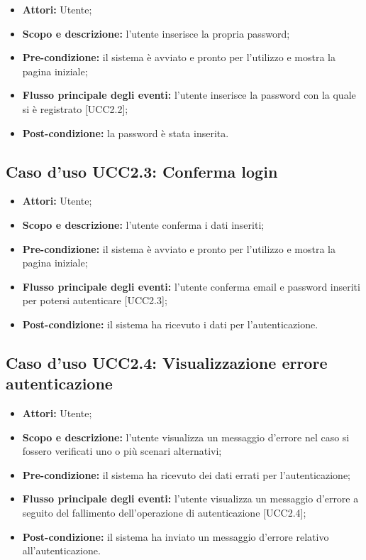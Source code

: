 \begin{itemize}
\item \textbf{Attori:} Utente;
\item \textbf{Scopo e descrizione:} l'utente inserisce la propria password;
\item \textbf{Pre-condizione:} il sistema è avviato e pronto per l'utilizzo e mostra la pagina iniziale;
\item \textbf{Flusso principale degli eventi:} l'utente inserisce la password con la quale si è registrato [UCC2.2];
\item \textbf{Post-condizione:} la password è stata inserita.
\end{itemize}

\subsection{Caso d'uso UCC2.3: Conferma login}

\begin{itemize}
\item \textbf{Attori:} Utente;
\item \textbf{Scopo e descrizione:} l'utente conferma i dati inseriti;
\item \textbf{Pre-condizione:} il sistema è avviato e pronto per l'utilizzo e mostra la pagina iniziale;
\item \textbf{Flusso principale degli eventi:} l'utente conferma email e password inseriti per potersi autenticare [UCC2.3];
\item \textbf{Post-condizione:} il sistema ha ricevuto i dati per l'autenticazione. 
\end{itemize}

\subsection{Caso d'uso UCC2.4: Visualizzazione errore autenticazione}

\begin{itemize}
\item \textbf{Attori:} Utente;
\item \textbf{Scopo e descrizione:} l'utente visualizza un messaggio d'errore nel caso si fossero verificati uno o più scenari alternativi;
\item \textbf{Pre-condizione:} il sistema ha ricevuto dei dati errati per l'autenticazione;
\item \textbf{Flusso principale degli eventi:} l'utente visualizza un messaggio d'errore a seguito del fallimento dell'operazione di autenticazione [UCC2.4];
\item \textbf{Post-condizione:} il sistema ha inviato un messaggio d'errore relativo all'autenticazione. 
\end{itemize}


